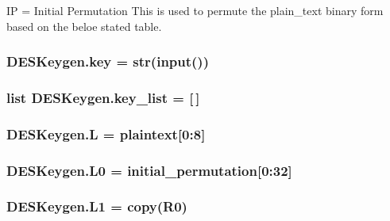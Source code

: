 IP = Initial Permutation This is used to permute the plain\+\_\+text binary form based on the beloe stated table. 

\subsubsection[{\texorpdfstring{key}{key}}]{\setlength{\rightskip}{0pt plus 5cm}D\+E\+S\+Keygen.\+key = str(input())}\hypertarget{namespaceDESKeygen_af43f014fafd9b989e2bc32538d373ed2}{}\label{namespaceDESKeygen_af43f014fafd9b989e2bc32538d373ed2}
\subsubsection[{\texorpdfstring{key\+\_\+list}{key_list}}]{\setlength{\rightskip}{0pt plus 5cm}list D\+E\+S\+Keygen.\+key\+\_\+list = \mbox{[}$\,$\mbox{]}}\hypertarget{namespaceDESKeygen_ae1fb953515172c35a43f6d1b1ad059d2}{}\label{namespaceDESKeygen_ae1fb953515172c35a43f6d1b1ad059d2}
\subsubsection[{\texorpdfstring{L}{L}}]{\setlength{\rightskip}{0pt plus 5cm}D\+E\+S\+Keygen.\+L = {\bf plaintext}\mbox{[}0\+:8\mbox{]}}\hypertarget{namespaceDESKeygen_aab60c41d9b210880b1939c4a61c98c1d}{}\label{namespaceDESKeygen_aab60c41d9b210880b1939c4a61c98c1d}
\subsubsection[{\texorpdfstring{L0}{L0}}]{\setlength{\rightskip}{0pt plus 5cm}D\+E\+S\+Keygen.\+L0 = {\bf initial\+\_\+permutation}\mbox{[}0\+:32\mbox{]}}\hypertarget{namespaceDESKeygen_a4e5c92568bcd7f5d99323f378860bf9d}{}\label{namespaceDESKeygen_a4e5c92568bcd7f5d99323f378860bf9d}
\subsubsection[{\texorpdfstring{L1}{L1}}]{\setlength{\rightskip}{0pt plus 5cm}D\+E\+S\+Keygen.\+L1 = copy({\bf R0})}\hypertarget{namespaceDESKeygen_a30327764187e06393c03bad43c2dc79a}{}\label{namespaceDESKeygen_a30327764187e06393c03bad43c2dc79a}
